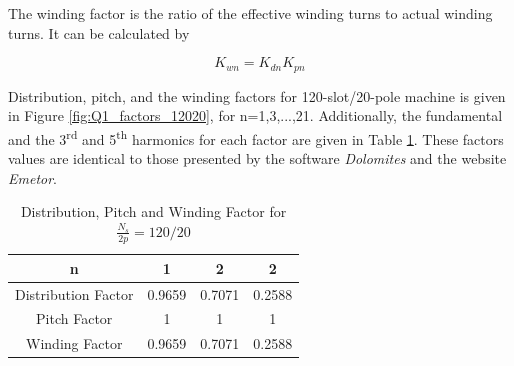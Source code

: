 \documentclass[a4paper, 11pt]{article}
\begin{document}
The winding factor is the ratio of the effective winding turns to actual winding turns. It can be calculated by

\begin{equation}
K_{wn} = K_{dn}K_{pn}
\label{eq:pitch_factor}
\end{equation}


Distribution, pitch, and the winding factors for 120-slot/20-pole machine is given in Figure \ref{fig:Q1_factors_12020}, for n=1,3,...,21. Additionally, the fundamental and the 3\textsuperscript{rd} and 5\textsuperscript{th} harmonics for each factor are given in Table \ref{tab:Q1_factors_12020}. These factors values are identical to those presented by the software \textit{Dolomites} and the website \textit{Emetor}.

\begin{table}[h!]
\centering
	\begin{tabular}{|c| c c c|} 
		\hline
		n & 1 & 2 & 2 \\ [0.5ex] 
		\hline
		Distribution Factor & 0.9659 & 0.7071 & 0.2588 \\ 
		\hline
		Pitch Factor & 1 & 1 & 1 \\
		\hline
		Winding Factor & 0.9659 & 0.7071 & 0.2588 \\
		\hline
	\end{tabular}
	\caption{Distribution, Pitch and Winding Factor for $\frac{N_s}{2p}=120/20$}
	\label{tab:Q1_factors_12020}
\end{table}
\end{document}
